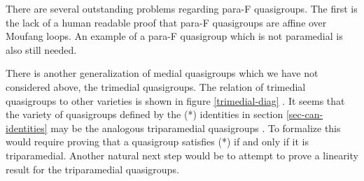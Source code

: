 \documentclass[12pt]{report}
\theoremstyle{definition}
\begin{document}
There are several outstanding problems regarding para-F quasigroups. The first is the lack of a human
  readable proof that para-F quasigroups are affine over Moufang loops. An example of a para-F quasigroup
  which is not paramedial is also still needed.

There is another generalization of medial quasigroups which we have not considered above, the
  trimedial quasigroups. The relation of trimedial quasigroups to other varieties is shown in
  figure \ref{trimedial-diag} \cite{trimedial}. It seems that the variety of quasigroups defined
  by the (*) identities in section \ref{sec-can-identities} may be the analogous triparamedial
  quasigroups \cite{trimedial}. To formalize this would require proving that a quasigroup satisfies (*)
  if and only if it is triparamedial. Another natural next step would be to attempt to prove a
  linearity result for the triparamedial quasigroups.
\end{document}
